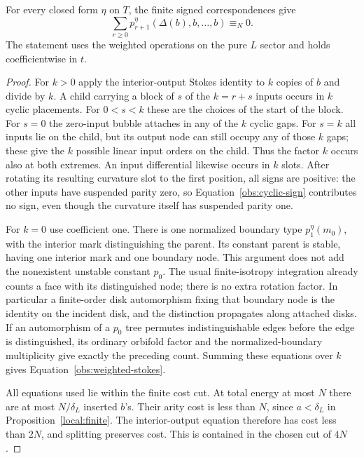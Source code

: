 \begin{proposition}
\label{obs:pairing-identity}
For every closed form $\eta$ on $T$, the finite signed
correspondences give
\begin{equation}
 \label{obs:weighted-stokes}
 \sum_{r\ge0}p_{r+1}^\eta(\Delta(b),b,\ldots,b)\equiv_N0.
\end{equation}
The statement uses the weighted operations on the pure $L$
sector and holds coefficientwise in $t$.
\end{proposition}

\begin{proof}
For $k>0$ apply the interior-output Stokes identity to $k$
copies of $b$ and divide by $k$.  A child carrying a block of
$s$ of the $k=r+s$ inputs occurs in $k$ cyclic placements.
For $0<s<k$ these are the choices of the start of the block.
For $s=0$ the zero-input bubble attaches in any of the $k$
cyclic gaps.  For $s=k$ all inputs lie on the child, but its
output node can still occupy any of those $k$ gaps; these give
the $k$ possible linear input orders on the child.  Thus the
factor $k$ occurs also at both extremes.  An input differential
likewise occurs in $k$ slots.  After rotating its resulting
curvature slot to the first position, all signs are positive:
the other inputs have suspended parity zero, so
Equation~\eqref{obs:cyclic-sign} contributes no sign, even
though the curvature itself has suspended parity one.

For $k=0$ use coefficient one.  There is one normalized
boundary type $p_1^\eta(m_0)$, with the interior mark
distinguishing the parent.  Its constant parent is stable,
having one interior mark and one boundary node.  This argument
does not add the nonexistent unstable constant $p_0$.
The usual finite-isotropy integration already counts a face
with its distinguished node; there is no extra rotation
factor.  In particular a finite-order disk automorphism
fixing that boundary node is the identity on the incident
disk, and the distinction propagates along attached disks.
If an automorphism of a $p_0$ tree permutes indistinguishable
edges before the edge is distinguished, its ordinary orbifold
factor and the normalized-boundary multiplicity give exactly
the preceding count.  Summing these equations over $k$ gives
Equation~\eqref{obs:weighted-stokes}.

All equations used lie within the finite cost cut.  At total
energy at most $N$ there are at most $N/\delta_L$ inserted
$b$'s.  Their arity cost is less than $N$, since
$a<\delta_L$ in Proposition~\ref{local:finite}.  The
interior-output equation therefore has cost less than $2N$,
and splitting preserves cost.  This is contained in the
chosen cut of $4N$.
\end{proof}

